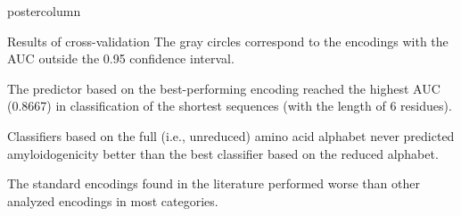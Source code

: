 \documentclass[final]{beamer}
\begin{document}
\begin{frame}
\begin{columns}
\begin{column}{.53\textwidth}
\begin{beamercolorbox}[center,wd=\textwidth]{postercolumn}
\begin{minipage}[T]{.95\textwidth}
{\begin{block}{Results of cross-validation}
\tiny
The 
gray circles correspond to the encodings with the AUC outside the 0.95 
confidence interval.

\normalsize	
\bigskip
The predictor based on the best-performing encoding reached the highest AUC (0.8667) 
in classification of the shortest sequences (with the length of 6 residues).

\bigskip

Classifiers based on the full (i.e., unreduced) amino acid alphabet never predicted 
amyloidogenicity better than the best classifier based on the reduced alphabet. 

\bigskip

The standard encodings found in the literature performed worse than other 
analyzed encodings in most categories.

\end{block}
\vfill


%     
%     
% 
% 
% 
% 
%       

\vfill




}
\end{minipage}
\end{beamercolorbox}
\end{column}




\end{columns}
\end{frame}
\end{document}
